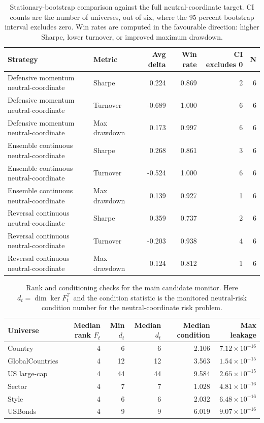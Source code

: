 \documentclass[11pt]{article}
\begin{document}
\begin{table}[!htbp]
\centering
\scriptsize
\begin{tabular}{llrrrr}
\toprule
Strategy & Metric & Avg delta & Win rate & CI excludes 0 & N \\
\midrule
Defensive momentum neutral-coordinate & Sharpe & 0.224 & 0.869 & 2 & 6 \\
Defensive momentum neutral-coordinate & Turnover & -0.689 & 1.000 & 6 & 6 \\
Defensive momentum neutral-coordinate & Max drawdown & 0.173 & 0.997 & 6 & 6 \\
Ensemble continuous neutral-coordinate & Sharpe & 0.268 & 0.861 & 3 & 6 \\
Ensemble continuous neutral-coordinate & Turnover & -0.524 & 1.000 & 6 & 6 \\
Ensemble continuous neutral-coordinate & Max drawdown & 0.139 & 0.927 & 1 & 6 \\
Reversal continuous neutral-coordinate & Sharpe & 0.359 & 0.737 & 2 & 6 \\
Reversal continuous neutral-coordinate & Turnover & -0.203 & 0.938 & 4 & 6 \\
Reversal continuous neutral-coordinate & Max drawdown & 0.124 & 0.812 & 1 & 6 \\
\bottomrule
\end{tabular}
\caption{Stationary-bootstrap comparison against the full neutral-coordinate target.  CI counts are the number of universes, out of six, where the 95 percent bootstrap interval excludes zero.  Win rates are computed in the favourable direction: higher Sharpe, lower turnover, or improved maximum drawdown.}
\label{tab:bootstrap}
\end{table}

\begin{table}[!htbp]
\centering
\small
\begin{tabular}{lrrrrr}
\toprule
Universe & Median rank $F_t$ & Min $d_t$ & Median $d_t$ & Median condition & Max leakage \\
\midrule
Country & 4 & 6 & 6 & 2.106 & $7.12\times10^{-16}$ \\
GlobalCountries & 4 & 12 & 12 & 3.563 & $1.54\times10^{-15}$ \\
US large-cap & 4 & 44 & 44 & 9.584 & $2.65\times10^{-15}$ \\
Sector & 4 & 7 & 7 & 1.028 & $4.81\times10^{-16}$ \\
Style & 4 & 6 & 6 & 2.032 & $6.48\times10^{-16}$ \\
USBonds & 4 & 9 & 9 & 6.019 & $9.07\times10^{-16}$ \\
\bottomrule
\end{tabular}
\caption{Rank and conditioning checks for the main candidate monitor.  Here $d_t=\dim\ker F_t^\top$ and the condition statistic is the monitored neutral-risk condition number for the neutral-coordinate risk problem.}
\label{tab:rank-conditioning}
\end{table}
\end{document}
